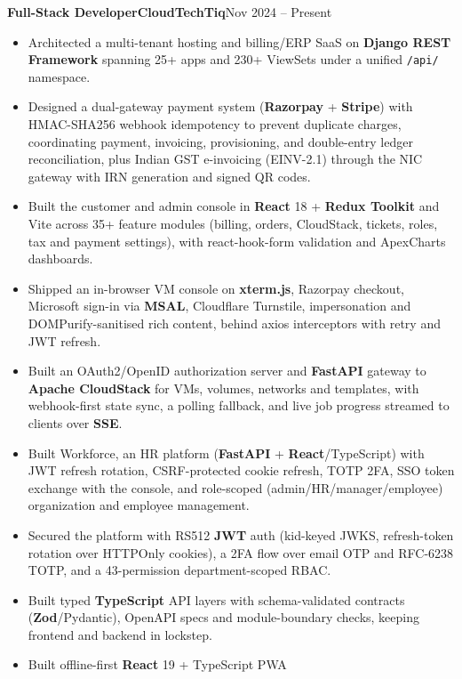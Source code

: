 \documentclass[11pt,a4paper]{article}
\newcommand{\entry}[3]{%
  \vspace{4.5pt}\noindent\textbf{#1}\hfill\textbf{#2}\hfill{\color{subtlegray}#3}\par\vspace{2pt}}
\begin{document}
\entry{Full-Stack Developer}{CloudTechTiq}{Nov 2024 -- Present}
\begin{itemize}
  \item Architected a multi-tenant hosting and billing/ERP SaaS on \textbf{Django
        REST Framework} spanning 25+ apps and 230+ ViewSets under a unified
        \texttt{/api/} namespace.
  \item Designed a dual-gateway payment system (\textbf{Razorpay} +
        \textbf{Stripe}) with HMAC-SHA256 webhook idempotency to prevent duplicate
        charges, coordinating payment, invoicing, provisioning, and double-entry
        ledger reconciliation, plus Indian GST e-invoicing (EINV-2.1) through the
        NIC gateway with IRN generation and signed QR codes.
  \item Built the customer and admin console in \textbf{React} 18 +
        \textbf{Redux Toolkit} and Vite across 35+ feature modules (billing,
        orders, CloudStack, tickets, roles, tax and payment settings), with
        react-hook-form validation and ApexCharts dashboards.
  \item Shipped an in-browser VM console on \textbf{xterm.js}, Razorpay
        checkout, Microsoft sign-in via \textbf{MSAL}, Cloudflare Turnstile,
        impersonation and DOMPurify-sanitised rich content, behind
        axios interceptors with retry and JWT refresh.
  \item Built an OAuth2/OpenID authorization server and \textbf{FastAPI}
        gateway to \textbf{Apache CloudStack} for VMs, volumes, networks and
        templates, with webhook-first state sync, a polling fallback, and live
        job progress streamed to clients over \textbf{SSE}.
  \item Built Workforce, an HR platform (\textbf{FastAPI} +
        \textbf{React}/TypeScript) with JWT refresh rotation, CSRF-protected
        cookie refresh, TOTP 2FA, SSO token exchange with the console, and
        role-scoped (admin/HR/manager/employee) organization and employee
        management.
  \item Secured the platform with RS512 \textbf{JWT} auth (kid-keyed JWKS,
        refresh-token rotation over HTTPOnly cookies), a 2FA flow over email OTP
        and RFC-6238 TOTP, and a 43-permission department-scoped RBAC.
  \item Built typed \textbf{TypeScript} API layers with schema-validated
        contracts (\textbf{Zod}/Pydantic), OpenAPI specs and module-boundary
        checks, keeping frontend and backend in lockstep.
  \item Built offline-first \textbf{React} 19 + TypeScript PWA

\end{itemize}
\end{document}
